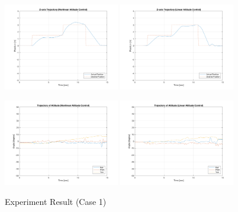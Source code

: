 \begin{figure}
    \includegraphics[width=0.45\textwidth]{graphics/experiment_plots/altitude_non_position_z.png}
    \includegraphics[width=0.45\textwidth]{graphics/experiment_plots/altitude_pid_position_z.png}

    \includegraphics[width=0.45\textwidth]{graphics/experiment_plots/altitude_non_attitude.png}
    \includegraphics[width=0.45\textwidth]{graphics/experiment_plots/altitude_pid_attitude.png}
    \caption{Experiment Result (Case 1)}
    \label{fig:exp_alt}
\end{figure}

